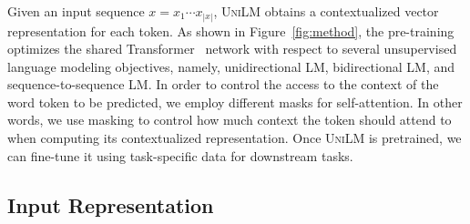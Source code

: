 \documentclass{article}
\newcommand\ours{\textsc{UniLM}}
\begin{document}
Given an input sequence $x = x_{1} \cdots x_{|x|}$, \ours{} obtains a contextualized vector representation for each token.
As shown in Figure~\ref{fig:method}, the pre-training optimizes the shared Transformer~\cite{transformer} network with respect to several unsupervised language modeling objectives, namely, unidirectional LM, bidirectional LM, and sequence-to-sequence LM.
In order to control the access to the context of the word token to be predicted, we employ different masks for self-attention. In other words, we use masking to control how much context the token should attend to when computing its contextualized representation.
Once \ours{} is pretrained, we can fine-tune it using task-specific data for downstream tasks.


\subsection{Input Representation}
\label{sec:input}
\end{document}
